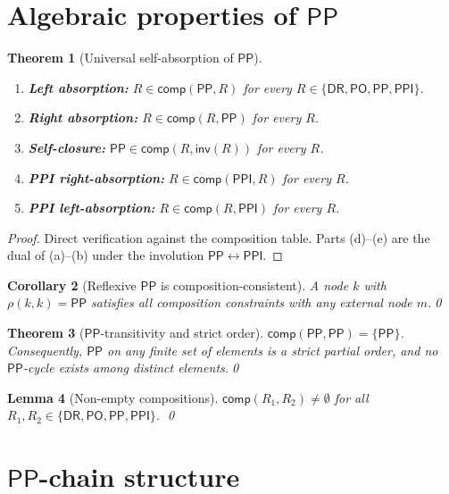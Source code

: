 \documentclass[a4paper,11pt]{article}
\newtheorem{theorem}{Theorem}[section]
\newtheorem{lemma}[theorem]{Lemma}
\newtheorem{corollary}[theorem]{Corollary}
\theoremstyle{definition}
\newcommand{\DR}{\ensuremath{\mathsf{DR}}}
\newcommand{\PO}{\ensuremath{\mathsf{PO}}}
\newcommand{\PP}{\ensuremath{\mathsf{PP}}}
\newcommand{\PPI}{\ensuremath{\mathsf{PPI}}}
\newcommand{\inv}{\ensuremath{\mathsf{inv}}}
\newcommand{\comp}{\ensuremath{\mathsf{comp}}}
\begin{document}
\section{Algebraic properties of $\PP$}\label{sec:pp-algebra}

\begin{theorem}[Universal self-absorption of $\PP$]
\label{thm:self-absorbing}
\begin{enumerate}[label=(\alph*)]
\item \textbf{Left absorption:} $R \in \comp(\PP, R)$ for every
  $R \in \{\DR,\PO,\PP,\PPI\}$.
\item \textbf{Right absorption:} $R \in \comp(R, \PP)$ for every $R$.
\item \textbf{Self-closure:} $\PP \in \comp(R, \inv(R))$ for every $R$.
\item \textbf{PPI right-absorption:} $R \in \comp(\PPI, R)$ for every $R$.
\item \textbf{PPI left-absorption:} $R \in \comp(R, \PPI)$ for every $R$.
\end{enumerate}
\end{theorem}

\begin{proof}
Direct verification against the composition table.  Parts (d)--(e)
are the dual of (a)--(b) under the involution $\PP \leftrightarrow
\PPI$.
\end{proof}

\begin{corollary}[Reflexive $\PP$ is composition-consistent]
\label{cor:reflexive-pp}
A node $k$ with $\rho(k,k) = \PP$ satisfies all composition
constraints with any external node $m$.\qed
\end{corollary}

\begin{theorem}[$\PP$-transitivity and strict order]
\label{thm:no-pp-cycle}
$\comp(\PP, \PP) = \{\PP\}$.  Consequently, $\PP$ on any finite set
of elements is a strict partial order, and no $\PP$-cycle exists among
distinct elements.\qed
\end{theorem}

\begin{lemma}[Non-empty compositions]\label{lem:nonempty}
$\comp(R_1, R_2) \ne \emptyset$ for all $R_1, R_2 \in
\{\DR,\PO,\PP,\PPI\}$. \qed
\end{lemma}


\section{$\PP$-chain structure}\label{sec:chain}
\end{document}
